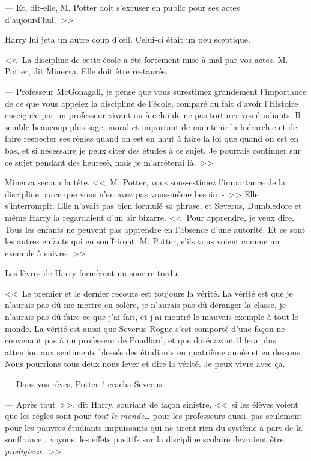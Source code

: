 --- Et, dit-elle, M. Potter doit s'excuser en public pour ses actes d'aujourd'hui.~>>

Harry lui jeta un autre coup d'œil. Celui-ci était un peu sceptique.

<<~La discipline de cette école a été fortement mise à mal par vos actes, M. Potter, dit Minerva. Elle doit être restaurée.

--- Professeur McGonagall, je pense que vous surestimez grandement l'importance de ce que vous appelez la discipline de l'école, comparé au fait d'avoir l'Histoire enseignée par un professeur vivant ou à celui de ne pas torturer vos étudiants. Il semble beaucoup plus sage, moral et important de maintenir la hiérarchie et de faire respecter ses règles quand on est en haut à faire la loi que quand on est en bas, et si nécessaire je peux citer des études à ce sujet. Je pourrais continuer sur ce sujet pendant des heuresè, mais je m'arrêterai là.~>>

Minerva secoua la tête. <<~M. Potter, vous sous-estimez l'importance de la discipline parce que vous n'en avez pas vous-même besoin~-~>> Elle s'interrompit. Elle n'avait pas bien formulé sa phrase, et Severus, Dumbledore et même Harry la regardaient d'un air bizarre. <<~Pour apprendre, je veux dire. Tous les enfants ne peuvent pas apprendre en l'absence d'une autorité. Et ce sont les autres enfants qui en souffriront, M. Potter, s'ils vous voient comme un exemple à suivre.~>>

Les lèvres de Harry formèrent un sourire tordu.

<<~Le premier et le dernier recours est toujours la vérité. La vérité est que je n'aurais pas dû me mettre en colère, je n'aurais pas dû déranger la classe, je n'aurais pas dû faire ce que j'ai fait, et j'ai montré le mauvais exemple à tout le monde. La vérité est aussi que Severus Rogue s'est comporté d'une façon ne convenant pas à un professeur de Poudlard, et que dorénavant il fera plus attention aux sentiments blessés des étudiants en quatrième année et en dessous. Nous pourrions tous deux nous lever et dire la vérité. Je peux vivre avec ça.

--- Dans vos rêves, Potter~! cracha Severus.

--- Après tout~>>, dit Harry, souriant de façon sinistre, <<~si les élèves voient que les règles sont pour \emph{tout le monde}… pour les professeurs aussi, pas seulement pour les pauvres étudiants impuissants qui ne tirent rien du système à part de la souffrance… voyons, les effets positifs sur la discipline scolaire devraient être \emph{prodigieux}.~>>

